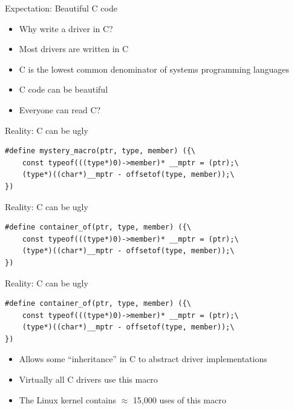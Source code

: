 \documentclass[NET,english,aspectratio=169,notitleframe]{tumbeamer}
\begin{document}
\begin{frame}{Expectation: Beautiful C code}
\begin{itemize}
\item Why write a driver in C?
\pause
\vspace{1em}
\item Most drivers are written in C
\item C is the lowest common denominator of systems programming languages
\item C code can be beautiful
\item Everyone can read C?
\end{itemize}
\end{frame}

\begin{frame}[fragile]{Reality: C can be ugly}
\begin{verbatim}
#define mystery_macro(ptr, type, member) ({\
	const typeof(((type*)0)->member)* __mptr = (ptr);\
	(type*)((char*)__mptr - offsetof(type, member));\
})
\end{verbatim}
\end{frame}

\begin{frame}[fragile]{Reality: C can be ugly}
\begin{verbatim}
#define container_of(ptr, type, member) ({\
	const typeof(((type*)0)->member)* __mptr = (ptr);\
	(type*)((char*)__mptr - offsetof(type, member));\
})
\end{verbatim}
\end{frame}


\begin{frame}[fragile]{Reality: C can be ugly}
\begin{verbatim}
#define container_of(ptr, type, member) ({\
	const typeof(((type*)0)->member)* __mptr = (ptr);\
	(type*)((char*)__mptr - offsetof(type, member));\
})
\end{verbatim}
\begin{itemize}
\item Allows some ``inheritance'' in C to abstract driver implementations
\item Virtually all C drivers use this macro
\item The Linux kernel contains $\approx$ 15,000 uses of this macro
\end{itemize}
\end{frame}
\end{document}

